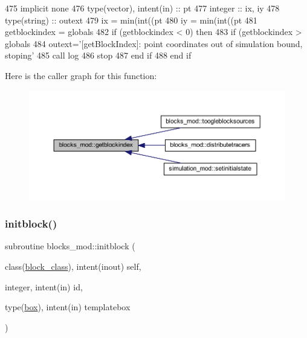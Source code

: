 \begin{DoxyCode}
475     \textcolor{keywordtype}{implicit none}
476     \textcolor{keywordtype}{type}(vector), \textcolor{keywordtype}{intent(in)} :: pt
477     \textcolor{keywordtype}{integer} :: ix, iy
478     \textcolor{keywordtype}{type}(string) :: outext
479     ix = min(int((pt%
480     iy = min(int((pt%
481     getblockindex = globals%
482     \textcolor{keywordflow}{if} (getblockindex < 0) \textcolor{keywordflow}{then}
483         \textcolor{keywordflow}{if} (getblockindex > globals%
484             outext=\textcolor{stringliteral}{'[getBlockIndex]: point coordinates out of simulation bound, stoping'}
485             \textcolor{keyword}{call }log%
486             stop
487 \textcolor{keywordflow}{        end if}
488 \textcolor{keywordflow}{    end if}
\end{DoxyCode}
Here is the caller graph for this function\+:\nopagebreak
\begin{figure}[H]
\begin{center}
\leavevmode
\includegraphics[width=350pt]{namespaceblocks__mod_a62e8fb0d6b2535b4499c7a4d848c24ba_icgraph}
\end{center}
\end{figure}
\mbox{\label{namespaceblocks__mod_a534ca69b17b6f54ee07f995b02feff39}} 
\subsubsection{\texorpdfstring{initblock()}{initblock()}}
{\footnotesize\ttfamily subroutine blocks\+\_\+mod\+::initblock (\begin{DoxyParamCaption}\item[{class(\mbox{\hyperlink{structblocks__mod_1_1block__class}{block\+\_\+class}}), intent(inout)}]{self,  }\item[{integer, intent(in)}]{id,  }\item[{type(\mbox{\hyperlink{structgeometry__mod_1_1box}{box}}), intent(in)}]{templatebox }\end{DoxyParamCaption})\hspace{0.3cm}{\ttfamily [private]}}



